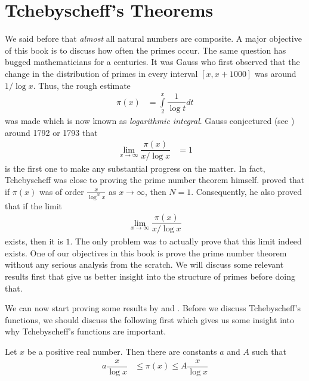 \documentclass[elemannt.tex]{subfile}
\begin{document}
	\chapter{Tchebyscheff's Theorems}
	We said before that \textit{almost} all natural numbers are composite. A major objective of this book is to discuss how often the primes occur. The same question has bugged mathematicians for a centuries. It was Gauss who first observed that the change in the distribution of primes in every interval $[x,x+1000]$ was around $1/\log{x}$. Thus, the rough estimate
		\begin{align*}
			\pi(x)
				& = \int\limits_{2}^{x}\dfrac{1}{\log{t}}dt
		\end{align*}
	was made which is now known as \textit{logarithmic integral}. Gauss conjectured (see \textcite[Page 37]{landau_1911}) around 1792 or 1793 that
		\begin{align*}
			\lim\limits_{x\to\infty}\dfrac{\pi(x)}{x/\log{x}}
				& = 1
		\end{align*}
	\textcite{tchebycheff_1852} is the first one to make any substantial progress on the matter. In fact, Tchebyscheff was close to proving the prime number theorem himself. \textcite{tschebischeff_1852} proved that if $\pi(x)$ was of order $\frac{x}{\log^{N}{x}}$ as $x\to\infty$, then $N=1$. Consequently, he also proved that if the limit
		\begin{align*}
			\lim_{x\to\infty}\dfrac{\pi(x)}{x/\log{x}}
		\end{align*}
	exists, then it is $1$. The only problem was to actually prove that this limit indeed exists. One of our objectives in this book is prove the prime number theorem without any serious analysis from the scratch. We will discuss some relevant results first that give us better insight into the structure of primes before doing that.
		
	We can now start proving some results by \textcite{tchebycheff_1852} and \textcite{tschebischeff_1852}. Before we discuss Tchebyscheff's functions, we should discuss the following first which gives us some insight into why Tchebyscheff's functions are important.
		\begin{theorem}[Tchebyscheff]\label{thm:tchebycheffbound}
			Let $x$ be a positive real number. Then there are constants $a$ and $A$ such that
				\begin{align*}
					a\dfrac{x}{\log{x}}
						& \leq \pi(x) \leq A\dfrac{x}{\log{x}}
				\end{align*}
		\end{theorem}
\end{document}
